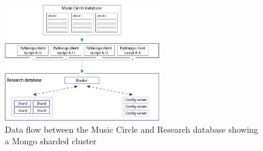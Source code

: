 \documentclass[11pt, oneside]{article}   	%
\begin{document}
\begin{figure}[h!]
  \centering
    \includegraphics[width=0.6\textwidth]{./datapipe.png}
      \caption{Data flow between the Music Circle and Research database showing a Mongo sharded cluster}
      \label{figure:datapipeline}
\end{figure}

\end{document}

